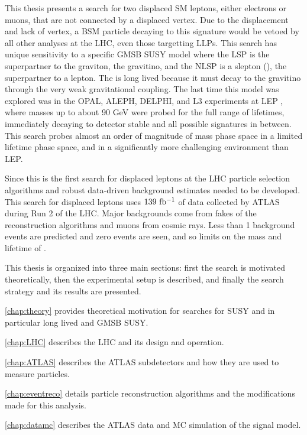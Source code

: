 This thesis presents a search for two displaced \ac{SM} leptons, either electrons or muons, that are not connected by a displaced vertex. Due to the displacement and lack of vertex, a \ac{BSM} particle decaying to this signature would be vetoed by all other analyses at the \ac{LHC}, even those targetting \acp{LLP}. This search has unique sensitivity to a specific \acf{GMSB} \acf{SUSY} model where the \acf{LSP} is the superpartner to the graviton, the gravitino, and the \acf{NLSP} is a slepton (\slep), the superpartner to a lepton. The \slep is long lived because it must decay to the gravitino through the very weak gravitational coupling. The last time this model was explored was in the OPAL, ALEPH, DELPHI, and L3 experiments at \acf{LEP} \cite{opal}, where masses up to about 90 GeV were probed for the full range of lifetimes, immediately decaying to detector stable and all possible signatures in between. This search probes almost an order of magnitude of mass phase space in a limited lifetime phase space, and in a significantly more challenging environment than \ac{LEP}.

Since this is the first search for displaced leptons at the \ac{LHC} particle selection algorithms and robust data-driven background estimates needed to be developed. This search for displaced leptons uses $139~ \mbox{fb\(^{-1}\)}$ of data collected by \ac{ATLAS} during Run 2 of the \ac{LHC}. Major backgrounds come from fakes of the reconstruction algorithms and muons from cosmic rays. Less than 1 background events are predicted and zero events are seen, and so limits on the mass and lifetime of \slep. 

This thesis is organized into three main sections: first the search is motivated theoretically, then the experimental setup is described, and finally the search strategy and its results are presented.

\autoref{chap:theory} provides theoretical motivation for searches for \ac{SUSY} and in particular long lived and \ac{GMSB} \ac{SUSY}.

\autoref{chap:LHC} describes the \ac{LHC} and its design and operation.

\autoref{chap:ATLAS} describes the \ac{ATLAS} subdetectors and how they are used to measure particles.

\autoref{chap:eventreco} details particle reconstruction algorithms and the modifications made for this analysis.

\autoref{chap:datamc} describes the \ac{ATLAS} data and \acf{MC} simulation of the signal model.

